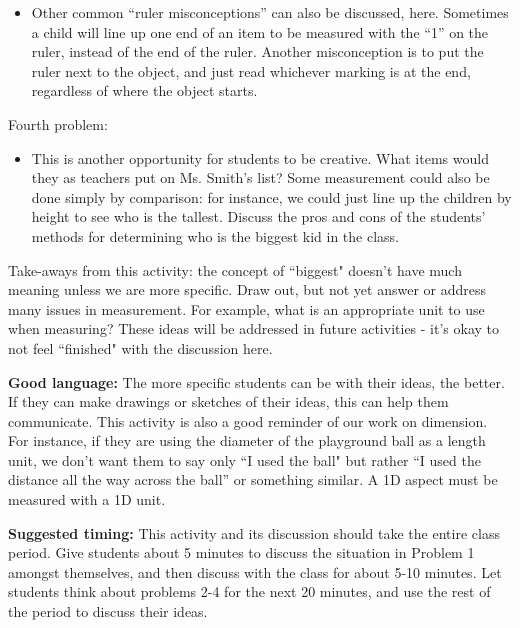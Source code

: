 \documentclass[nooutcomes,noauthor]{ximera}
\begin{document}
\begin{instructorNotes}
\begin{itemize}
      \item  Other common ``ruler misconceptions'' can also be discussed, here.  Sometimes a child will line up one end of an item to be measured with the ``1'' on the ruler, instead of the end of the ruler.  Another misconception is to put the ruler next to the object, and just read whichever marking is at the end, regardless of where the object starts.
\end{itemize}

Fourth problem:
\begin{itemize}
        \item This is another opportunity for students to be creative.  What items would they as teachers put on Ms. Smith's list?  Some measurement could also be done simply by comparison: for instance, we could just line up the children by height to see who is the tallest.  Discuss the pros and cons of the students' methods for determining who is the biggest kid in the class.
\end{itemize}




Take-aways from this activity: the concept of ``biggest" doesn't have much meaning unless we are more specific.  Draw out, but not yet answer or address many issues in measurement.  For example, what is an appropriate unit to use when measuring?  These ideas will be addressed in future activities - it's okay to not feel ``finished" with the discussion here.

{\bf Good language:} The more specific students can be with their ideas, the better. If they can make drawings or sketches of their ideas, this can help them communicate. This activity is also a good reminder of our work on dimension. For instance, if they are using the diameter of the playground ball as a length unit, we don't want them to say only ``I used the ball" but rather ``I used the distance all the way across the ball'' or something similar. A 1D aspect must be measured with a 1D unit.

{\bf Suggested timing:} This activity and its discussion should take the entire class period.  Give students about 5 minutes to discuss the situation in Problem 1 amongst themselves, and then discuss with the class for about 5-10 minutes.  Let students think about problems 2-4 for the next 20 minutes, and use the rest of the period to discuss their ideas.

\end{instructorNotes}
\end{document}
